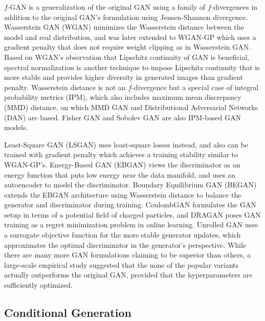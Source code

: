 $f$-GAN \cite{nowozin2016fgan} is a generalization of the original GAN using a family of $f$-divergences in addition to the original GAN's formulation using Jensen-Shannon divergence.
Wasserstein GAN (WGAN) \cite{arjovsky2017wgan} minimizes the Wasserstein distance between the model and real distribution, and was later extended to WGAN-GP \cite{gulrajani2017wgan} which uses a gradient penalty that does not require weight clipping as in Wasserstein GAN.
Based on WGAN's observation that Lipschitz continuity of GAN is beneficial, spectral normalization \cite{miyato2018spectral} is another technique to impose Lipschitz continuity that is more stable and provides higher diversity in generated images than gradient penalty.
Wasserstein distance is not an $f$-divergence but a special case of integral probability metrics (IPM), which also includes maximum mean discrepancy (MMD) distance, on which MMD GAN \cite{li2017mmdgan} and Distributional Adversarial Networks (DAN) \cite{li2017dan} are based.
Fisher GAN \cite{mroueh2017fishergan} and Sobolev GAN \cite{mroueh2018gan} are also IPM-based GAN models.

Least-Square GAN (LSGAN) \cite{mao2017lsgan} uses least-square losses instead, and also can be trained with gradient penalty \cite{mao2017effectiveness} which achieves a training stability similar to WGAN-GP's.
Energy-Based GAN (EBGAN) \cite{zhao2017ebgan} views the discriminator as an energy function that puts low energy near the data manifold, and uses an autoencoder to model the discriminator. Boundary Equilibrium GAN (BEGAN) \cite{berthelot2017began} extends the EBGAN architecture using Wasserstein distance to balance the generator and discriminator during training.
CoulombGAN \cite{unterthiner2017coulomb} formulates the GAN setup in terms of a potential field of charged particles, and DRAGAN \cite{kodali2017gan} poses GAN training as a regret minimization problem in online learning.
Unrolled GAN \cite{metz2016unrolled} uses a surrogate objective function for the more stable generator updates, which approximates the optimal discriminator in the generator's perspective.
While there are many more GAN formulations claiming to be superior than others, a large-scale empirical study \cite{lucic2017gan} suggested that the none of the popular variants actually outperforms the original GAN, provided that the hyperparameters are sufficiently optimized.


\subsection{Conditional Generation}

